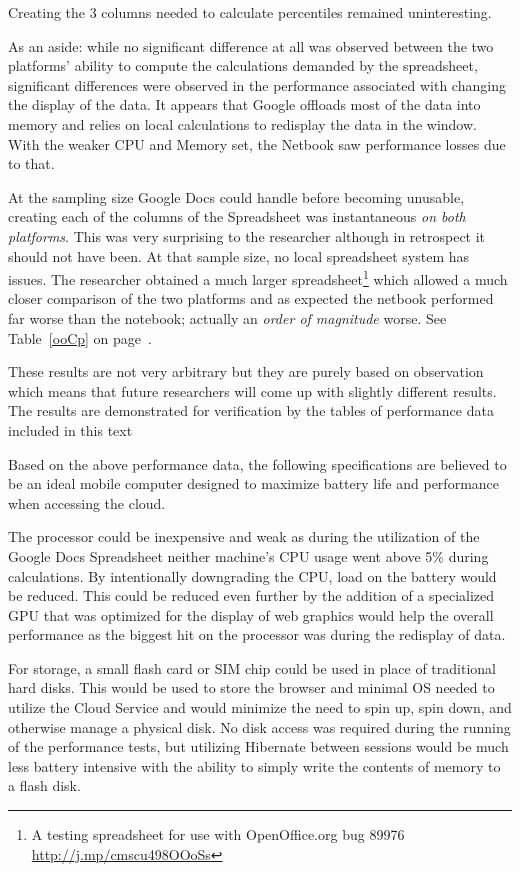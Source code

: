

Creating the 3 columns needed to calculate percentiles remained uninteresting.

As an aside: while no significant difference at all was observed between the
two platforms' ability to compute the calculations demanded by the spreadsheet,
significant differences were observed in the performance associated with
changing the display of the data.  It appears that Google offloads most of the
data into memory and relies on local calculations to redisplay the data in the
window.  With the weaker CPU and Memory set, the Netbook saw performance losses
due to that.

At the sampling size Google Docs could handle before becoming unusable, creating
each of the columns of the Spreadsheet was instantaneous \emph{on both
  platforms}.  This was very surprising to the researcher although in retrospect
it should not have been.  At that sample size, no local spreadsheet system has
issues.  The researcher obtained a much larger spreadsheet\footnote{A testing
  spreadsheet for use with OpenOffice.org bug 89976
  \url{http://j.mp/cmscu498OOoSs}} which allowed a much closer comparison of the
two platforms and as expected the netbook performed far worse than the notebook;
actually an \emph{order of magnitude} worse. See Table~\ref{ooCp} on
page~\pageref{ooCp}.



These results are not very arbitrary but they are purely based on observation
which means that future researchers will come up with slightly different
results.  The results are demonstrated for verification by the tables of
performance data included in this text

Based on the above performance data, the following specifications are believed
to be an ideal mobile computer designed to maximize battery life and performance
when accessing the cloud.

The processor could be inexpensive and weak as during the utilization of the
Google Docs Spreadsheet neither machine's CPU usage went above 5\% during
calculations.  By intentionally downgrading the CPU, load on the battery would
be reduced.  This could be reduced even further by the addition of a specialized
GPU that was optimized for the display of web graphics would help the overall
performance as the biggest hit on the processor was during the redisplay of
data.

For storage, a small flash card or SIM chip could be used in place of
traditional hard disks.  This would be used to store the browser and minimal OS
needed to utilize the Cloud Service and would minimize the need to spin up, spin
down, and otherwise manage a physical disk.  No disk access was required during
the running of the performance tests, but utilizing Hibernate between sessions
would be much less battery intensive with the ability to simply write the
contents of memory to a flash disk.

